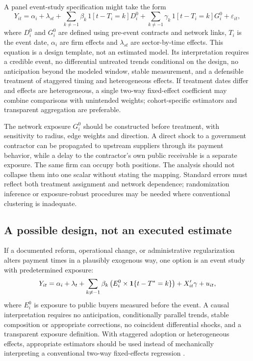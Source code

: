 \documentclass[11pt,a4paper]{article}
\begin{document}
A panel event-study specification might take the form
\begin{equation}
Y_{it}=\alpha_i+\lambda_{st}+\sum_{k\ne-1}\beta_k\,1[t-T_i=k]D_i^0+\sum_{k\ne-1}\gamma_k\,1[t-T_i=k]G_i^0+\varepsilon_{it},
\label{eq:event_study_network}
\end{equation}
where $D_i^0$ and $G_i^0$ are defined using pre-event contracts and network links, $T_i$ is the event date, $\alpha_i$ are firm effects and $\lambda_{st}$ are sector-by-time effects. This equation is a design template, not an estimated model. Its interpretation requires a credible event, no differential untreated trends conditional on the design, no anticipation beyond the modeled window, stable measurement, and a defensible treatment of staggered timing and heterogeneous effects. If treatment dates differ and effects are heterogeneous, a single two-way fixed-effect coefficient may combine comparisons with unintended weights; cohort-specific estimators and transparent aggregation are preferable.

The network exposure $G_i^0$ should be constructed before treatment, with sensitivity to radius, edge weights and direction. A direct shock to a government contractor can be propagated to upstream suppliers through its payment behavior, while a delay to the contractor's own public receivable is a separate exposure. The same firm can occupy both positions. The analysis should not collapse them into one scalar without stating the mapping. Standard errors must reflect both treatment assignment and network dependence; randomization inference or exposure-robust procedures may be needed where conventional clustering is inadequate.

\subsection{A possible design, not an executed estimate}
If a documented reform, operational change, or administrative regularization alters payment times in a plausibly exogenous way, one option is an event study with predetermined exposure:
\begin{equation}
Y_{it}=\alpha_i+\lambda_t+\sum_{k\neq-1}\beta_k\left(E_i^0\times\mathbf 1\{t-T^*=k\}\right)+X_{it}'\gamma+u_{it}, \label{eq:eventstudy}
\end{equation}
where $E_i^0$ is exposure to public buyers measured before the event. A causal interpretation requires no anticipation, conditionally parallel trends, stable composition or appropriate corrections, no coincident differential shocks, and a transparent exposure definition. With staggered adoption or heterogeneous effects, appropriate estimators should be used instead of mechanically interpreting a conventional two-way fixed-effects regression \citep{callaway2021,sun2021,baker2026}.
\end{document}
